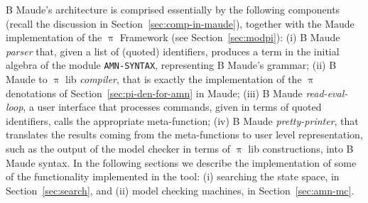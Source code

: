 \documentclass[a4paper,openany]{book}
\begin{document}
B Maude's architecture is comprised essentially by the following components (recall the discussion in Section~\ref{sec:comp-in-maude}), together with the Maude implementation of the $\uppi$ Framework (see Section~\ref{sec:modpi}): (i) B Maude \emph{parser} that, given a list of (quoted) identifiers, produces a term in the initial algebra of the module \texttt{AMN-SYNTAX}, representing B Maude's grammar; 
(ii) B Maude to $\uppi$ lib \emph{compiler}, that is exactly the implementation of the $\uppi$ denotations of Section~\ref{sec:pi-den-for-amn} in Maude; (iii) B Maude \emph{read-eval-loop}, a user interface that processes commands, given in terms of quoted identifiers, calls the appropriate meta-function; (iv) B Maude \emph{pretty-printer}, that translates the results coming from the meta-functions to user level representation, such as the output of the model checker in terms of $\uppi$ lib constructions, into B Maude syntax. In the following sections we describe the implementation of some of the functionality implemented in the tool: 
(i) searching the state space, in Section~\ref{sec:search}, and (ii) model checking machines, in Section~\ref{sec:amn-mc}.
\end{document}
